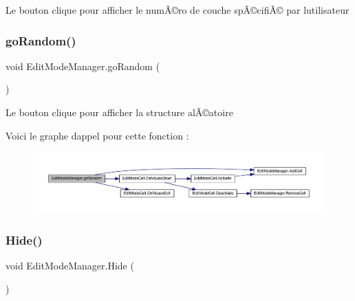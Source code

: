 Le bouton clique pour afficher le numÃ©ro de couche spÃ©cifiÃ© par l\textquotesingle{}utilisateur 

\mbox{\label{class_edit_mode_manager_a96ee789fb9bf31726bf942d334775a92}} 
\subsubsection{\texorpdfstring{go\+Random()}{goRandom()}}
{\footnotesize\ttfamily void Edit\+Mode\+Manager.\+go\+Random (\begin{DoxyParamCaption}{ }\end{DoxyParamCaption})\hspace{0.3cm}{\ttfamily [inline]}}



Le bouton clique pour afficher la structure alÃ©atoire 

Voici le graphe d\textquotesingle{}appel pour cette fonction \+:
\nopagebreak
\begin{figure}[H]
\begin{center}
\leavevmode
\includegraphics[width=350pt]{class_edit_mode_manager_a96ee789fb9bf31726bf942d334775a92_cgraph}
\end{center}
\end{figure}
\mbox{\label{class_edit_mode_manager_aacc30d9cdb3d747fbad20130903ec24e}} 
\subsubsection{\texorpdfstring{Hide()}{Hide()}}
{\footnotesize\ttfamily void Edit\+Mode\+Manager.\+Hide (\begin{DoxyParamCaption}{ }\end{DoxyParamCaption})\hspace{0.3cm}{\ttfamily [inline]}}



